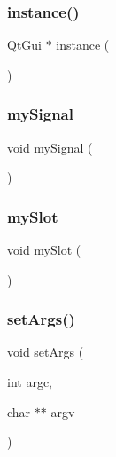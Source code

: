 \mbox{\label{classQtGui_a493a8e6df5ef99234afa0f9d5e75bb8f}} 
\subsubsection{\texorpdfstring{instance()}{instance()}}
{\footnotesize\ttfamily \mbox{\hyperlink{classQtGui}{Qt\+Gui}} $\ast$ instance (\begin{DoxyParamCaption}{ }\end{DoxyParamCaption})\hspace{0.3cm}{\ttfamily [static]}}

\mbox{\label{classQtGui_a2bcfdc8e485c8204ce10442882aa3563}} 
\subsubsection{\texorpdfstring{my\+Signal}{mySignal}}
{\footnotesize\ttfamily void my\+Signal (\begin{DoxyParamCaption}{ }\end{DoxyParamCaption})\hspace{0.3cm}{\ttfamily [signal]}}

\mbox{\label{classQtGui_a22b8a1caa164dc9333b18859137a7e84}} 
\subsubsection{\texorpdfstring{my\+Slot}{mySlot}}
{\footnotesize\ttfamily void my\+Slot (\begin{DoxyParamCaption}{ }\end{DoxyParamCaption})\hspace{0.3cm}{\ttfamily [slot]}}

\mbox{\label{classQtGui_af1a059b29256886524d1b7a1db0323d8}} 
\subsubsection{\texorpdfstring{set\+Args()}{setArgs()}}
{\footnotesize\ttfamily void set\+Args (\begin{DoxyParamCaption}\item[{int}]{argc,  }\item[{char $\ast$$\ast$}]{argv }\end{DoxyParamCaption})}

